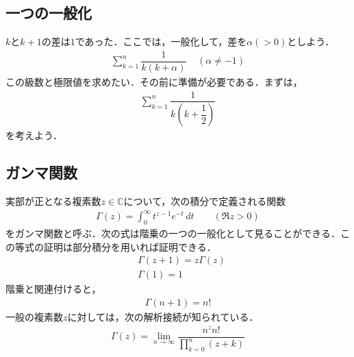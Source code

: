 \documentclass[12pt]{jsarticle}
\begin{document}
\subsection*{一つの一般化}
$k$と$k+1$の差は$1$であった．ここでは，一般化して，差を$\alpha(>0)$としよう．
\begin{align*}
\sum_{k=1}^{n} \dfrac{1}{k(k+\alpha)} \ \ \ \ \ (\alpha \neq -1)
\end{align*}
この級数と極限値を求めたい．その前に準備が必要である．まずは，
\begin{align*}
\sum_{k=1}^{n} \dfrac{1}{k\left(k+\dfrac{1}{2}\right)}
\end{align*}
を考えよう．

\subsection*{ガンマ関数}
実部が正となる複素数$z \in \mathbb{C}$について，次の積分で定義される関数
\begin{align*}
\Gamma (z)=\int _{0}^{\infty }t^{z-1}e^{-t}\,dt\qquad (\Re {z}>0)
\end{align*}
をガンマ関数と呼ぶ．次の式は階乗の一つの一般化として見ることができる．この等式の証明は部分積分を用いれば証明できる．
\begin{align*}
&\Gamma (z+1)=z\Gamma (z)\\
&\Gamma (1) = 1
\end{align*}
階乗と関連付けると，
\begin{align*}
\Gamma (n+1)=n!
\end{align*}
一般の複素数$z$に対しては，次の解析接続が知られている．
\begin{align*}
\Gamma (z)=\lim _{n\to \infty }{\dfrac {n^{z}n!}{\prod_{k=0}^{n}{(z+k)}}}
\end{align*}
\end{document}
